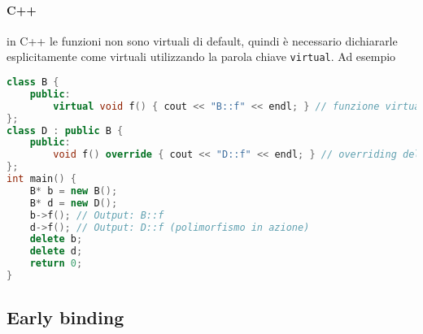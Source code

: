 \documentclass{report}
\begin{document}
\paragraph{C++}
in C++ le funzioni non sono virtuali di default, quindi è necessario dichiararle esplicitamente come virtuali utilizzando la parola chiave \texttt{virtual}. Ad esempio
\begin{lstlisting}[language=C++]
class B {
    public:
        virtual void f() { cout << "B::f" << endl; } // funzione virtuale
};  
class D : public B {
    public:
        void f() override { cout << "D::f" << endl; } // overriding della funzione virtuale
};
int main() {
    B* b = new B();
    B* d = new D();
    b->f(); // Output: B::f
    d->f(); // Output: D::f (polimorfismo in azione)
    delete b;
    delete d;
    return 0;
}
\end{lstlisting}
\subsection{Early binding}



\end{document}
